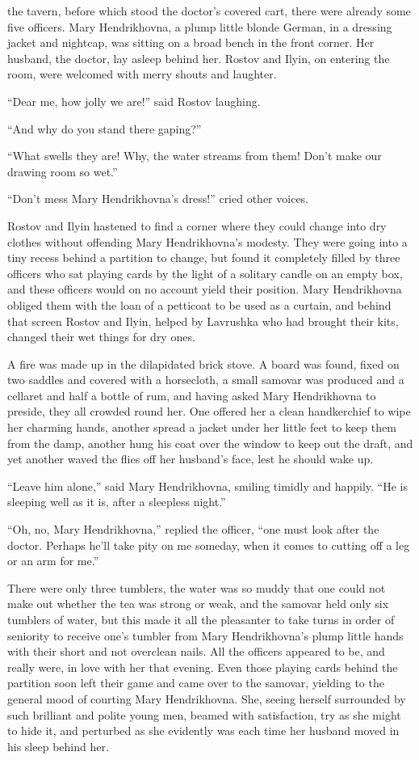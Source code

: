  the tavern, before which stood the doctor's covered cart,
there were already some five officers. Mary Hendrikhovna, a plump
little blonde German, in a dressing jacket and nightcap, was
sitting on a broad bench in the front corner. Her husband, the
doctor, lay asleep behind her.  Rostov and Ilyin, on entering the
room, were welcomed with merry shouts and laughter.

``Dear me, how jolly we are!'' said Rostov laughing.

``And why do you stand there gaping?''

``What swells they are! Why, the water streams from them! Don't
make our drawing room so wet.''

``Don't mess Mary Hendrikhovna's dress!'' cried other voices.

Rostov and Ilyin hastened to find a corner where they could
change into dry clothes without offending Mary Hendrikhovna's
modesty. They were going into a tiny recess behind a partition to
change, but found it completely filled by three officers who sat
playing cards by the light of a solitary candle on an empty box,
and these officers would on no account yield their position. Mary
Hendrikhovna obliged them with the loan of a petticoat to be used
as a curtain, and behind that screen Rostov and Ilyin, helped by
Lavrushka who had brought their kits, changed their wet things
for dry ones.

A fire was made up in the dilapidated brick stove. A board was
found, fixed on two saddles and covered with a horsecloth, a
small samovar was produced and a cellaret and half a bottle of
rum, and having asked Mary Hendrikhovna to preside, they all
crowded round her. One offered her a clean handkerchief to wipe
her charming hands, another spread a jacket under her little feet
to keep them from the damp, another hung his coat over the window
to keep out the draft, and yet another waved the flies off her
husband's face, lest he should wake up.

``Leave him alone,'' said Mary Hendrikhovna, smiling timidly and
happily.  ``He is sleeping well as it is, after a sleepless
night.''

``Oh, no, Mary Hendrikhovna,'' replied the officer, ``one must
look after the doctor. Perhaps he'll take pity on me someday,
when it comes to cutting off a leg or an arm for me.''

There were only three tumblers, the water was so muddy that one
could not make out whether the tea was strong or weak, and the
samovar held only six tumblers of water, but this made it all the
pleasanter to take turns in order of seniority to receive one's
tumbler from Mary Hendrikhovna's plump little hands with their
short and not overclean nails. All the officers appeared to be,
and really were, in love with her that evening. Even those
playing cards behind the partition soon left their game and came
over to the samovar, yielding to the general mood of courting
Mary Hendrikhovna. She, seeing herself surrounded by such
brilliant and polite young men, beamed with satisfaction, try as
she might to hide it, and perturbed as she evidently was each
time her husband moved in his sleep behind her.

